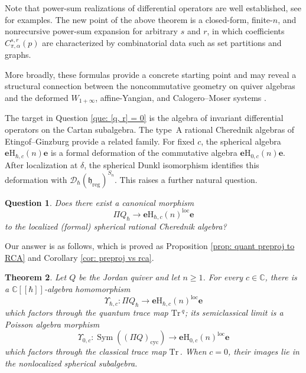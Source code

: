 \documentclass[11pt,reqno]{amsart}
\newtheorem{theorem}{Theorem}[section]
\newtheorem{question}[theorem]{Question}
\theoremstyle{definition}
\newcommand{\bbC}{\mathbb{C}}
\newcommand{\be}{\mathbf{e}}
\newcommand{\Tr}{\mathrm{Tr} \,}
\newcommand{\mD}{\mathcal{D}}
\newcommand{\rmH}{\mathrm{H}}
\newcommand{\cyc}{\mathrm{cyc}}
\newcommand{\Sym}{\operatorname{Sym}}
\newcommand{\fkh}{\mathfrak{h}}
\newcommand{\reg}{\mathrm{reg}}
\newcommand{\loc}{{\mathrm{loc}}}
\begin{document}
Note that power-sum realizations of differential operators are
well established,
see \cite{SerVes2015,Dra2024Gen} for examples.
The new point of the above theorem is a closed-form,
finite-\(n\), and nonrecursive power-sum expansion for arbitrary \(s\) and \(r\), in which coefficients \(C_{\pi,\alpha}^{s,r} (p)\) are
characterized by combinatorial data such as set partitions and graphs.

More broadly,
these formulas provide a concrete starting point and may reveal a structural connection between the noncommutative geometry on quiver algebras
and the deformed \(W_{1+\infty}\), affine-Yangian, and
Calogero--Moser systems \cite{ArbSch2013,KN2016Qua,SchVas2013,DesHal2012}.



The target in Question
\ref{que: [q, r] = 0} is the algebra of invariant 
differential operators on the Cartan subalgebra. 
The type~A rational Cherednik algebras of Etingof--Ginzburg
\cite{EG2002} provide a related family.
For fixed \(c\), the spherical algebra
\(\be\rmH_{\hbar,c}(n)\be\) is a formal deformation of the
commutative algebra \(\be\rmH_{0,c}(n)\be\).
After localization at \(\delta\), the spherical Dunkl
isomorphism identifies this deformation with
\(\mD_\hbar(\fkh_{\reg})^{S_n}\)\cite{EG2002,Eti2009Lec}.
This raises a further natural question.

\begin{question}\label{que: rca}
Does there exist a canonical morphism 
\[
\Pi Q_{\hbar}
\longrightarrow
\be\rmH_{\hbar,c}(n)^{\loc}\be
\]
to the localized (formal) spherical rational Cherednik algebra?
\end{question}




Our answer is as follows,
which is proved as Proposition
\ref{prop: quant preproj to RCA} and Corollary \ref{cor: preproj vs rca}.

\begin{theorem}
\label{thmfrompreprojintro}
Let \(Q\) be the Jordan quiver and let \(n\geq1\).  For every
\(c\in\bbC\), there is a \(\bbC[[\hbar]]\)-algebra homomorphism
\[
\Upsilon_{\hbar,c}:
\Pi Q_{\hbar}
\longrightarrow
\be\rmH_{\hbar,c}(n)^\loc\be
\]
which factors through the quantum trace map \(\Tr^q\);
its semiclassical limit is a Poisson algebra morphism
\[
\Upsilon_{0,c}:
\Sym((\Pi Q)_\cyc)
\longrightarrow
\be\rmH_{0,c}(n)^\loc\be
\]
which factors through the classical trace map \(\Tr\).
When \(c=0\), their images lie in the nonlocalized spherical subalgebra.
\end{theorem}
\end{document}
